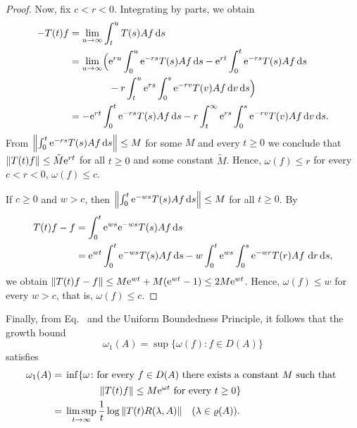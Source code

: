 \begin{proof}
Now, fix $c < r < 0$.
Integrating by parts, we obtain
\begin{align*}
-T(t)f 
  & = \lim_{u \to \infty} \int_{t}^{u} T(s)Af \diff{s}\\
  & = \lim_{u \to \infty} \Bigl( 
       \eu^{ru} \int_0^u \eu^{-rs} T(s) Af \diff{s} 
     - \eu^{rt} \int_0^t \eu^{-rs} T(s) Af \diff{s} \\
  & \hphantom{{}= \lim_{u \to \infty} \Bigl(}
     {}- r \int_t^u \eu^{rs} \int_0^s \eu^{-rv} T(v) Af \diff{v} \diff{s}
     \Bigr) \\
  & = - \eu^{rt} \int_0^t \eu^{-rs} T(s) Af \diff{s} 
     - r \int_t^\infty \eu^{rs} \int_0^s \eu^{-rv} T(v) Af \diff{v} \diff{s}.
\end{align*}
From $\left\|\int_{0}^{t} \eu^{-r s} T(s)Af  \ds\right\| \leq M$ for some $M$ and every $t \geq 0$ we conclude that $\|T(t)f\| \leq \tilde{M}\eu^{rt}$ for all $t \geq 0$ and some constant $\tilde{M}$.
Hence, $\omega(f) \leq r$ for every $c < r < 0$, \ie $\omega(f) \leq c$.

If\/ $c \geq 0$ and $w > c$, then $\left\|\int_{0}^{t} \eu^{-w s} T(s)Af \ds\right\| \leq M$ for all $t \geq 0$. 
By 
\begin{align*}
T(t)f - f & = \int_{0}^{t} \mathrm{e}^{w s} \mathrm{e}^{-w s} T(s)Af  \mathop{}\!\mathrm{d}{s}\\
& = \mathrm{e}^{wt}\int_0^t \mathrm{e}^{-ws} T(s)Af \mathop{}\!\mathrm{d}{s} - w\int_0^t\mathrm{e}^{ws}\int_0^s \mathrm{e}^{-wr} T(r)Af\, \mathop{}\!\mathrm{d}{r} \mathop{}\!\mathrm{d}{s},
\end{align*}
we obtain $\|T(t)f-f\| \leq M\eu^{w t} + M(\eu^{w t} - 1)
 \leq 2M\eu^{wt}$. 
Hence, $\omega(f) \leq w$ for every $w > c$, that is, $\omega(f) \leq c$.
\end{proof}
Finally, from Eq.~ and the Uniform Boundedness Principle, it follows that the growth bound 
%
\[
	\omega_{1}(A) = \sup\{\omega(f) \colon f \in D(A)\}
\]
%
satisfies
\begin{equation}\label{eq:a4-1.3}
\begin{split}
\omega_1(A) &={} \inf \{ \omega \colon \text{for every  $f \in D(A)$  there exists a constant $ M $ such that  } \\
& \phantom{xxxxxxxx} \text{ $\|T(t)f\| \leq M\eu^{\omega t}$  for every $t \geq 0$} \} \\
&={}
\limsup_{t \to \infty} \frac{1}{t} \log\|T(t)R(\lambda,A)\| \quad (\lambda \in \rho(A)). 
\end{split}
\end{equation}
